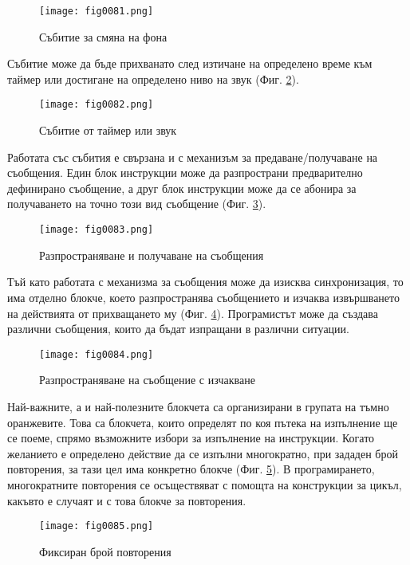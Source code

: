 \begin{figure}[H]
  \centering
  \texttt{[image: fig0081.png]}
  \caption{Събитие за смяна на фона}
\label{fig0081}
\end{figure}

Събитие може да бъде прихванато след изтичане на определено време към таймер или достигане на определено ниво на звук (Фиг. \ref{fig0082}).

\begin{figure}[H]
  \centering
  \texttt{[image: fig0082.png]}
  \caption{Събитие от таймер или звук}
\label{fig0082}
\end{figure}

Работата със събития е свързана и с механизъм за предаване/получаване на съобщения. Един блок инструкции може да разпространи предварително дефинирано съобщение, а друг блок инструкции може да се абонира за получаването на точно този вид съобщение (Фиг. \ref{fig0083}).

\begin{figure}[H]
  \centering
  \texttt{[image: fig0083.png]}
  \caption{Разпространяване и получаване на съобщения}
\label{fig0083}
\end{figure}

Тъй като работата с механизма за съобщения може да изисква синхронизация, то има отделно блокче, което разпространява съобщението и изчаква извършването на действията от прихващането му (Фиг. \ref{fig0084}). Програмистът може да създава различни съобщения, които да бъдат изпращани в различни ситуации. 

\begin{figure}[H]
  \centering
  \texttt{[image: fig0084.png]}
  \caption{Разпространяване на съобщение с изчакване}
\label{fig0084}
\end{figure}

Най-важните, а и най-полезните блокчета са организирани в групата на тъмно оранжевите. Това са блокчета, които определят по коя пътека на изпълнение ще се поеме, спрямо възможните избори за изпълнение на инструкции. Когато желанието е определено действие да се изпълни многократно, при зададен брой повторения, за тази цел има конкретно блокче (Фиг. \ref{fig0085}). В програмирането, многократните повторения се осъществяват с помощта на конструкции за цикъл, какъвто е случаят и с това блокче за повторения.

\begin{figure}[H]
  \centering
  \texttt{[image: fig0085.png]}
  \caption{Фиксиран брой повторения}
\label{fig0085}
\end{figure}

